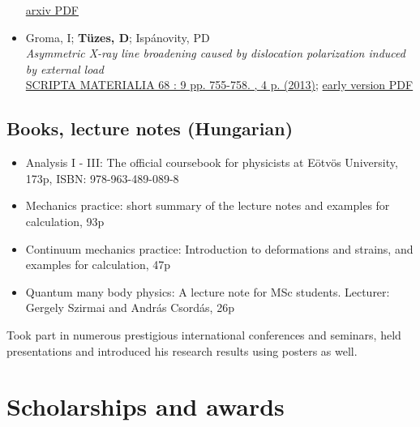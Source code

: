 \documentclass[10pt,USletter,sans]{moderncv}        %
\begin{document}
\begin{itemize}
    \href{https://arxiv.org/pdf/1604.01645}{arxiv PDF}
\item Groma, I; \textbf{Tüzes, D}; Ispánovity, PD\\
    \emph{Asymmetric X-ray line broadening caused by dislocation polarization induced by external load}\\
    \href{https://www.sciencedirect.com/science/article/pii/S1359646213000110}{SCRIPTA MATERIALIA 68 : 9 pp. 755-758. , 4 p. (2013)}; \href{http://metal.elte.hu/~tuzes/docs/pre\%20AsymmetricX-ray\%20line\%20broadening\%20caused\%20by\%20dislocation\%20polarization\%20induced\%20by\%20external\%20load.pdf}{early version PDF}
\end{itemize}
    
\subsection{Books, lecture notes (Hungarian)}
\begin{itemize}
\item Analysis I - III: The official coursebook for physicists at Eötvös University, 173p, ISBN: 978-963-489-089-8
\item Mechanics practice: short summary of the lecture notes and examples for calculation, 93p
\item Continuum mechanics practice: Introduction to deformations and strains, and examples for calculation, 47p
\item Quantum many body physics: A lecture note for MSc students. Lecturer: Gergely Szirmai and András Csordás, 26p
\end{itemize}
\vspace{6pt}
Took part in numerous prestigious international conferences and seminars, held presentations and introduced his research results using posters as well. 

\section{Scholarships and awards}
\end{document}
